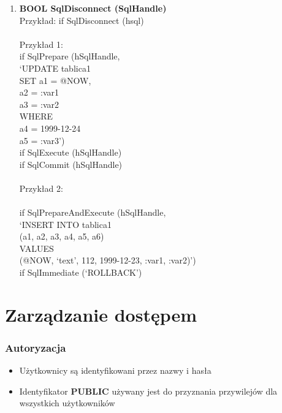\documentclass[a4paper,twoside]{article}
\begin{document}
\begin{enumerate}
  		\item \textbf{BOOL SqlDisconnect (SqlHandle)}\\
  		Przykład:
  		if SqlDisconnect (hsql)\\\\
  		Przykład 1:\\
  		if SqlPrepare (hSqlHandle, \\
  		‘UPDATE tablica1 \\
  		SET	a1 = @NOW,\\
  		a2 = :var1\\
  		a3 = :var2\\
  		WHERE\\
  		a4 = 1999-12-24\\
  		a5 = :var3’)\\
  		if SqlExecute (hSqlHandle)\\
  		if SqlCommit (hSqlHandle)\\\\
  		Przykład 2:\\\\
  		if SqlPrepareAndExecute (hSqlHandle, \\
  		‘INSERT INTO tablica1 \\
  		(a1, a2, a3, a4, a5, a6)\\
  		VALUES\\
  		(@NOW, ‘text’, 112, 1999-12-23, :var1, :var2)’)\\
  		if SqlImmediate (‘ROLLBACK’)
  	\end{enumerate}
  		
  	
  	\part*{Zarządzanie dostępem}
  	
  	\section*{Autoryzacja}
  	\begin{itemize}
  		\item Użytkownicy są identyfikowani przez nazwy i hasła 
  		\item Identyfikator \textbf{PUBLIC} używany jest do przyznania przywilejów dla wszystkich użytkowników
  	\end{itemize}
  	
\end{document}
